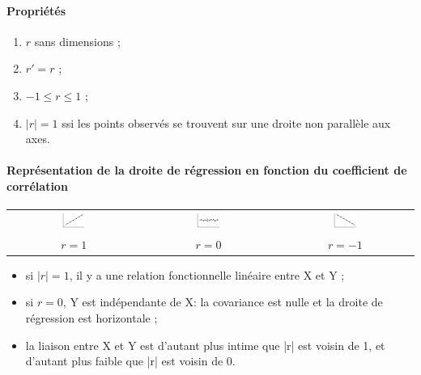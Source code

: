 \paragraph{Propriétés}
\begin{enumerate}
	\item $r$ sans dimensions ;
	\item $r' = r$ ;
	\item $-1 \leq r \leq 1$ ;
	\item $|r| = 1$ ssi les points observés se trouvent sur une droite non parallèle aux axes.
\end{enumerate}
\paragraph{Représentation de la droite de régression en fonction du coefficient de corrélation}
\begin{center}
	\begin{tabular}{ccc}
		\includegraphics[width=0.2\textwidth]{images/coefficient-correlation1.pdf}&
		\includegraphics[width=0.2\textwidth]{images/coefficient-correlation0.pdf}&
		\includegraphics[width=0.2\textwidth]{images/coefficient-correlation-1.pdf}\\
		$r=1$&$r=0$&$r=-1$\\
	\end{tabular}
\end{center}
\begin{itemize}
	\item si $|r| = 1$, il y a une relation fonctionnelle linéaire entre X et Y ;
	\item si $r = 0$, Y est indépendante de X: la covariance est nulle et la droite de régression est horizontale ;
	\item la liaison entre X et Y est d’autant plus intime que |r| est voisin de 1, et d’autant plus faible que |r| est voisin de 0.
\end{itemize}








